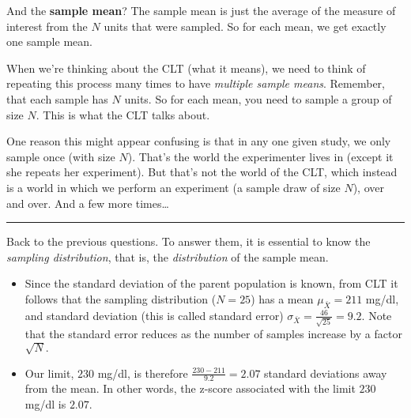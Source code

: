 \documentclass[]{book}
\providecommand{\tightlist}{%
  \setlength{\itemsep}{0pt}\setlength{\parskip}{0pt}}
\begin{document}
And the \textbf{sample mean}? The sample mean is just the average of the
measure of interest from the \(N\) units that were sampled. So for each
mean, we get exactly one sample mean.

When we're thinking about the CLT (what it means), we need to think of
repeating this process many times to have \emph{multiple sample means}.
Remember, that each sample has \(N\) units. So for each mean, you need
to sample a group of size \(N\). This is what the CLT talks about.

One reason this might appear confusing is that in any one given study,
we only sample once (with size \(N\)). That's the world the experimenter
lives in (except it she repeats her experiment). But that's not the
world of the CLT, which instead is a world in which we perform an
experiment (a sample draw of size \(N\)), over and over. And a few more
times\ldots{}

\begin{center}\rule{0.5\linewidth}{\linethickness}\end{center}

Back to the previous questions. To answer them, it is essential to know
the \emph{sampling distribution}, that is, the \emph{distribution} of
the sample mean.

\begin{itemize}
\tightlist
\item
  Since the standard deviation of the parent population is known, from
  CLT it follows that the sampling distribution (\(N=25\)) has a mean
  \(\mu_{\bar{X}} = 211\) mg/dl, and standard deviation (this is called
  standard error) \(\sigma_{\bar{X}} = \frac{46}{\sqrt{25}} = 9.2.\)
  Note that the standard error reduces as the number of samples increase
  by a factor \(\sqrt{N}.\)
\item
  Our limit, \(230\) mg/dl, is therefore
  \(\frac{230 - 211}{9.2} = 2.07\) standard deviations away from the
  mean. In other words, the z-score associated with the limit \(230\)
  mg/dl is \(2.07\).
\end{itemize}
\end{document}
